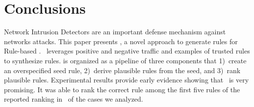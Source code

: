 \documentclass[sigconf,review, anonymous]{acmart}
\begin{document}


\section{Conclusions}

Network Intrusion Detectors are an important defense mechanism against
networks attacks. This paper presents \tname{}, a novel approach to
generate rules for Rule-based \nids. \tname\ leverages positive and
negative traffic and examples of trusted rules to synthesize
rules. \tname{} is organized as a pipeline of three components that
1)~create an overspecified seed rule, 2)~derive plausible rules from
the seed, and 3)~rank plausible rules. Experimental results provide
early evidence showing that \tname\ is very promising. It was able to
rank the correct rule among the first five rules of the reported
ranking in \percTopFiveRanking\ of the cases we analyzed.


\balance


\end{document}
